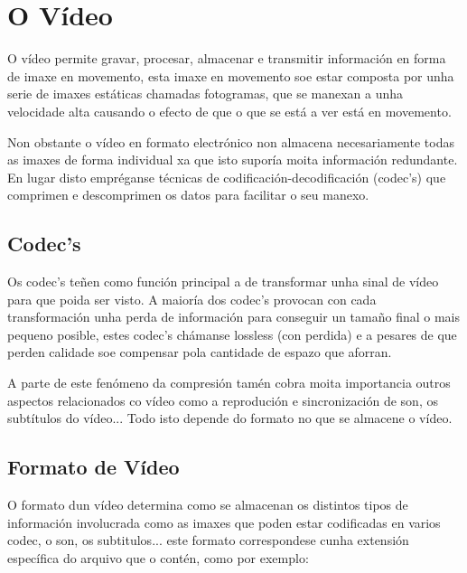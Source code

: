 		
\section{O Vídeo}
    O vídeo permite gravar, procesar, almacenar e transmitir información en forma de 
    imaxe en movemento, esta imaxe en movemento soe estar composta por unha serie de imaxes 
    estáticas chamadas fotogramas, que se manexan a unha velocidade alta causando o efecto de que o
    que se está a ver está en movemento.
    
    Non obstante o vídeo en formato electrónico non almacena necesariamente todas as imaxes de forma
    individual xa que isto suporía moita información redundante. En lugar disto empréganse técnicas
    de codificación-decodificación (codec's) que comprimen e descomprimen os datos para facilitar o
    seu manexo.

    \subsection{Codec's}
        Os codec's teñen como función principal a de transformar unha sinal de vídeo para que poida
        ser visto. A maioría dos codec's provocan con cada transformación unha perda de información
        para conseguir un tamaño final o mais pequeno posible, estes codec's chámanse lossless (con 
        perdida) e a pesares de que perden calidade soe compensar pola cantidade de espazo que 
        aforran.
        
        A parte de este fenómeno da compresión tamén cobra moita importancia outros aspectos 
        relacionados co vídeo como a reprodución e sincronización de son, os subtítulos do vídeo...
        Todo isto depende do formato no que se almacene o vídeo.
        
    \subsection{Formato de Vídeo}
        O formato dun vídeo determina como se almacenan os distintos tipos de información involucrada
        como as imaxes que poden estar codificadas en varios codec, o son, os subtitulos...
        este formato correspondese cunha extensión específica do arquivo que o contén, como por 
        exemplo:
        

